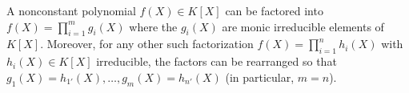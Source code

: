 A nonconstant polynomial $f(X) \in K[X]$ can be factored into $f(X) = \prod_{i=1}^m g_i(X)$ where the $g_i(X)$ are monic irreducible elements of $K[X]$. Moreover, for any other such factorization $f(X) = \prod_{i=1}^n h_i(X)$ with $h_i(X) \in K[X]$ irreducible, the factors can be rearranged so that $g_1(X) = h_{1'}(X), \ldots, g_m(X) = h_{n'}(X)$ (in particular, $m = n$).
